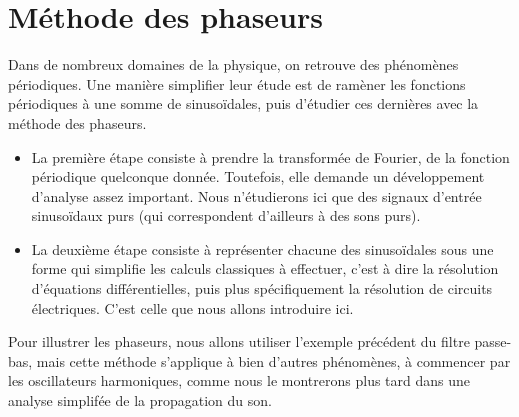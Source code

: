 \section{Méthode des phaseurs}

Dans de nombreux domaines de la physique,
on retrouve des phénomènes périodiques.
Une manière simplifier leur étude
est de ramèner les fonctions périodiques à une somme de sinusoïdales,
puis d'étudier ces dernières avec la méthode des phaseurs.
\begin{itemize}
    \item La première étape consiste à prendre la transformée de Fourier,
        de la fonction périodique quelconque donnée.
        Toutefois, elle demande un développement d'analyse assez important.
        Nous n'étudierons ici que des signaux d'entrée sinusoïdaux purs
        (qui correspondent d'ailleurs à des sons purs).
    \item La deuxième étape consiste à représenter chacune des sinusoïdales
        sous une forme qui simplifie les calculs classiques à effectuer,
        c'est à dire la résolution d'équations différentielles,
        puis plus spécifiquement la résolution de circuits électriques.
        C'est celle que nous allons introduire ici.
\end{itemize}

Pour illustrer les phaseurs, nous allons utiliser l'exemple précédent
du filtre passe-bas,
mais cette méthode s'applique à bien d'autres phénomènes,
à commencer par les oscillateurs harmoniques,
comme nous le montrerons plus tard dans
une analyse simplifée de la propagation du son.




